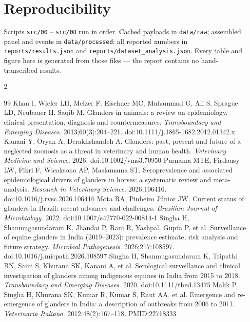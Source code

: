 \documentclass[11pt]{article}
\begin{document}
\section*{Reproducibility}

\noindent
Scripts \texttt{src/00} -- \texttt{src/08} run in order. Cached payloads in
\texttt{data/raw}; assembled panel and events in \texttt{data/processed}; all reported numbers
in \texttt{reports/results.json} and \texttt{reports/dataset\_analysis.json}. Every table and
figure here is generated from those files --- the report contains no hand-transcribed results.

\begin{multicols}{2}
\begin{thebibliography}{99}
\footnotesize
\setlength{\itemsep}{0.15em}
\setlength{\parskip}{0pt}
 Khan I, Wieler LH, Melzer F, Elschner MC, Muhammad G, Ali S, Sprague LD, Neubauer H, Saqib M. Glanders in animals: a review on epidemiology, clinical presentation, diagnosis and countermeasures. \emph{Transboundary and Emerging Diseases}. 2013;60(3):204--221. doi:10.1111/j.1865-1682.2012.01342.x
 Kanani Y, Oryan A, Derakhshandeh A. Glanders: past, present and future of a neglected zoonosis as a threat in veterinary and human health. \emph{Veterinary Medicine and Science}. 2026. doi:10.1002/vms3.70950
 Purnama MTE, Firdausy LW, Fikri F, Wicaksono AP, Maslamama ST. Seroprevalence and associated epidemiological drivers of glanders in horses: a systematic review and meta-analysis. \emph{Research in Veterinary Science}. 2026;106416. doi:10.1016/j.rvsc.2026.106416
 Mota RA, Pinheiro J\'unior JW. Current status of glanders in Brazil: recent advances and challenges. \emph{Brazilian Journal of Microbiology}. 2022. doi:10.1007/s42770-022-00814-1
 Singha H, Shanmugasundaram K, Jhandai P, Rani R, Yashpal, Gupta P, et al. Surveillance of equine glanders in India (2019--2023): prevalence estimate, risk analysis and future strategy. \emph{Microbial Pathogenesis}. 2026;217:108597. doi:10.1016/j.micpath.2026.108597
 Singha H, Shanmugasundaram K, Tripathi BN, Saini S, Khurana SK, Kanani A, et al. Serological surveillance and clinical investigation of glanders among indigenous equines in India from 2015 to 2018. \emph{Transboundary and Emerging Diseases}. 2020. doi:10.1111/tbed.13475
 Malik P, Singha H, Khurana SK, Kumar R, Kumar S, Raut AA, et al. Emergence and re-emergence of glanders in India: a description of outbreaks from 2006 to 2011. \emph{Veterinaria Italiana}. 2012;48(2):167--178. PMID:22718333

\end{thebibliography}
\end{multicols}
\end{document}
